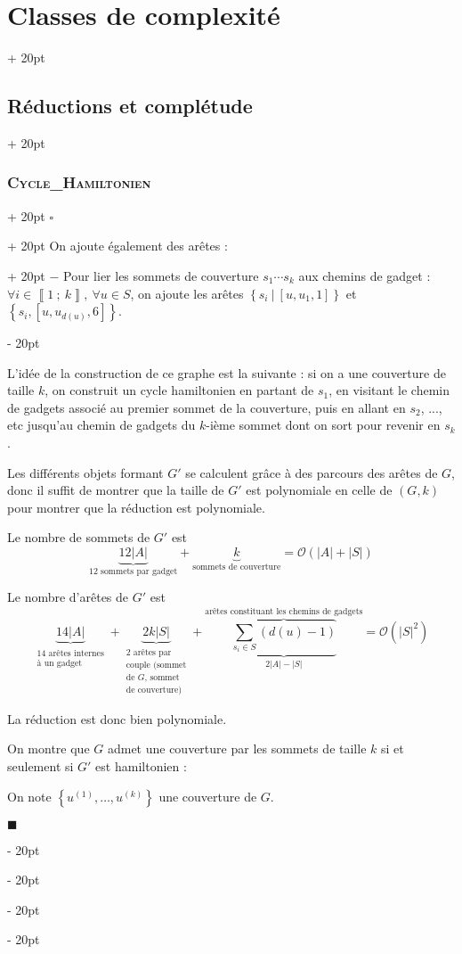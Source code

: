 \documentclass[a4paper, 12pt, twoside]{article}
\newcommand{\nset}[2]{\left\llbracket #1\ ;\ #2 \right\rrbracket}
\newcommand{\set}[1]{\left\{ #1 \right\}}
\newcommand{\abs}[1]{\left\lvert #1 \right\rvert}
\newcommand{\ind}[1][20pt]{\advance\leftskip + #1}
\newcommand{\deind}[1][20pt]{\advance\leftskip - #1}
\newenvironment{indt}[2][20pt]{#2 \par \ind[#1]}{\par \deind} %
\newenvironment{proof}[1][{}]{\begin{indt}{$\square$ #1}}{$\blacksquare$ \end{indt}}
\begin{document}
\begin{indt}{\section{Classes de complexité}}
\begin{indt}{\subsection{Réductions et complétude}}
\begin{indt}{\subsubsection{\textsc{Cycle\_Hamiltonien}}}
\begin{proof}
\begin{indt}{On ajoute également des arêtes :}
                        $-$ Pour lier les sommets de couverture $s_1 \cdots s_k$ aux chemins de gadget : $\forall i \in \nset 1 k,\ \forall u \in S$, on ajoute les arêtes $\set{s_i\ |\ [u, u_1, 1]}$ et $\set{s_i, [u, u_{d(u)}, 6]}$.
                    \end{indt}

                    L'idée de la construction de ce graphe est la suivante : si on a une couverture de taille $k$, on construit un cycle hamiltonien en partant de $s_1$, en visitant le chemin de gadgets associé au premier sommet de la couverture, puis en allant en $s_2$, ..., etc jusqu'au chemin de gadgets du $k$-ième sommet dont on sort pour revenir en $s_k$.

                    Les différents objets formant $G'$ se calculent grâce à des parcours des arêtes de $G$, donc il suffit de montrer que la taille de $G'$ est polynomiale en celle de $(G, k)$ pour montrer que la réduction est polynomiale.

                    Le nombre de sommets de $G'$ est
                    \[
                        \underbrace{12\abs A}_{\text{12 sommets par gadget}}
                        + \underbrace{k}_{\text{sommets de couverture}}
                        = \mathcal O(\abs A + \abs S)
                    \]

                    Le nombre d'arêtes de $G'$ est
                    \[
                        \underbrace{14\abs A}_{\substack{\text{14 arêtes internes} \\ \text{à un gadget}}}
                        + \underbrace{2k\abs S}_{\substack{\text{2 arêtes par} \\ \text{couple (sommet} \\ \text{de $G$, sommet} \\ \text{de couverture)}}}
                        + \displaystyle \overbrace{\underbrace{\sum_{s_i \in S} (d(u) - 1)}_{2\abs A - \abs S}}^{\text{arêtes constituant les chemins de gadgets}}
                        = \mathcal O(\abs S ^2)
                    \]

                    La réduction est donc bien polynomiale.

                    On montre que $G$ admet une couverture par les sommets de taille $k$ si et seulement si $G'$ est hamiltonien :

                    \vspace{6pt}
                    
                    \boxed{\Rightarrow} On note $\set{u^{(1)}, \ldots, u^{(k)}}$ une couverture de $G$.


\end{proof}
\end{indt}
\end{indt}
\end{indt}
\end{document}
